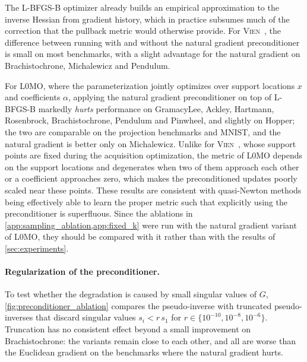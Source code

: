 \documentclass{article}
\newcommand{\wycoff}{\textsc{L0MO}}
\newcommand{\vien}{\textsc{Vien}~\cite{vien2018bayesian}}
\begin{document}

The L-BFGS-B optimizer already builds an empirical approximation to the inverse Hessian from gradient history, which in practice subsumes much of the correction that the pullback metric would otherwise provide.
For \vien{}, the difference between running with and without the natural gradient preconditioner is small on most benchmarks, with a slight advantage for the natural gradient on Brachistochrone, Michalewicz and Pendulum.

For \wycoff{}, where the parameterization jointly optimizes over support locations $x$ and coefficients $\alpha$, applying the natural gradient preconditioner on top of L-BFGS-B markedly \emph{hurts} performance on GramacyLee, Ackley, Hartmann, Rosenbrock, Brachistochrone, Pendulum and Pinwheel, and slightly on Hopper; the two are comparable on the projection benchmarks and MNIST, and the natural gradient is better only on Michalewicz.
Unlike for \vien{}, whose support points are fixed during the acquisition optimization, the metric of \wycoff{} depends on the support locations and degenerates when two of them approach each other or a coefficient approaches zero, which makes the preconditioned updates poorly scaled near these points.
These results are consistent with quasi-Newton methods being effectively able to learn the proper metric such that explicitly using the preconditioner is superfluous.
Since the ablations in \cref{app:sampling_ablation,app:fixed_k} were run with the natural gradient variant of \wycoff{}, they should be compared with it rather than with the results of \cref{sec:experiments}.

\paragraph{Regularization of the preconditioner.}
To test whether the degradation is caused by small singular values of $G$, \cref{fig:preconditioner_ablation} compares the pseudo-inverse with truncated pseudo-inverses that discard singular values $s_i < r\, s_1$ for $r \in \{10^{-10}, 10^{-8}, 10^{-6}\}$.
Truncation has no consistent effect beyond a small improvement on Brachistochrone: the variants remain close to each other, and all are worse than the Euclidean gradient on the benchmarks where the natural gradient hurts.
\end{document}
